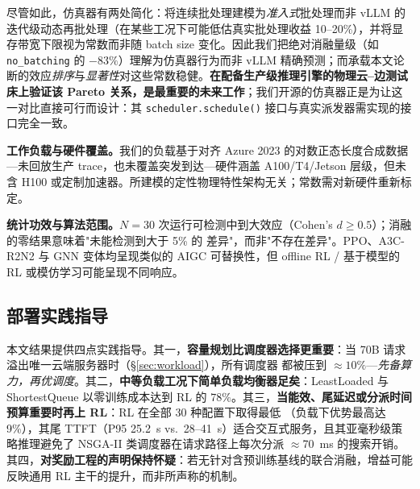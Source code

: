 尽管如此，仿真器有两处简化：将连续批处理建模为\emph{准入式}批处理而非 vLLM 的迭代级动态再批处理（在某些工况下可能低估真实批处理收益 10--20\%），并将显存带宽下限视为常数而非随 batch size 变化。因此我们把绝对消融量级（如 \texttt{no\_batching} 的 $-83\%$）理解为仿真器行为而非 vLLM 精确预测；而承载本文论断的效应\emph{排序}与\emph{显著性}对这些常数稳健。\textbf{在配备生产级推理引擎的物理云--边测试床上验证该 Pareto 关系，是最重要的未来工作}；我们开源的仿真器正是为让这一对比直接可行而设计：其 \texttt{scheduler.schedule()} 接口与真实派发器需实现的接口完全一致。

\textbf{工作负载与硬件覆盖。}我们的负载基于对齐 Azure 2023 的对数正态长度合成数据---未回放生产 trace，也未覆盖突发到达---硬件涵盖 A100/T4/Jetson 层级，但未含 H100 或定制加速器。所建模的定性物理特性架构无关；常数需对新硬件重新标定。

\textbf{统计功效与算法范围。}$N=30$ 次运行可检测中到大效应（Cohen's $d \ge 0.5$）；消融的零结果意味着"未能检测到大于 5\% 的 \slo{} 差异"，而非"不存在差异"。PPO、A3C-R2N2 与 GNN 变体均呈现类似的 AIGC 可替换性，但 offline RL / 基于模型的 RL 或模仿学习可能呈现不同响应。

\subsection{部署实践指导}
\label{sec:guidance}

本文结果提供四点实践指导。其一，\textbf{容量规划比调度器选择更重要}：当 70B 请求溢出唯一云端服务器时（\S\ref{sec:workload}），所有调度器 \slo{} 都被压到 ${\approx}10\%$---\emph{先备算力，再优调度}。其二，\textbf{中等负载工况下简单负载均衡器足矣}：LeastLoaded 与 ShortestQueue 以零训练成本达到 RL \slo{} 的 $78\%$。其三，\textbf{当能效、尾延迟或分派时间预算重要时再上 RL}：RL 在全部 30 种配置下取得最低 \etok{}（负载下优势最高达 9\%），其尾 TTFT（P95 25.2~s vs.\ 28--41~s）适合交互式服务，且其亚毫秒级策略推理避免了 NSGA-II 类调度器在请求路径上每次分派 $\approx$70~ms 的搜索开销。其四，\textbf{对奖励工程的声明保持怀疑}：若无针对含预训练基线的联合消融，增益可能反映通用 RL 主干的提升，而非所声称的机制。
